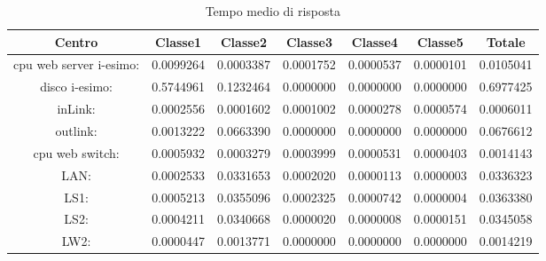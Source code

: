 \begin{table}[H]
\begin{center}\begin{scriptsize}
\begin{tabular}{||c|c|c|c|c|c|c||}
\hline
Centro &Classe1 &Classe2 &Classe3 &Classe4 &Classe5 &Totale\\
\hline
\hline
 cpu web server i-esimo: 	&0.0099264	&0.0003387	&0.0001752	&0.0000537	&0.0000101	&0.0105041\\
\hline
 disco i-esimo: 	&0.5744961	&0.1232464	&0.0000000	&0.0000000	&0.0000000	&0.6977425\\
\hline
 inLink: 	&0.0002556	&0.0001602	&0.0001002	&0.0000278	&0.0000574	&0.0006011\\
\hline
 outlink: 	&0.0013222	&0.0663390	&0.0000000	&0.0000000	&0.0000000	&0.0676612\\
\hline
 cpu web switch: 	&0.0005932	&0.0003279	&0.0003999	&0.0000531	&0.0000403	&0.0014143\\
\hline
 LAN: 	&0.0002533	&0.0331653	&0.0002020	&0.0000113	&0.0000003	&0.0336323\\
\hline
 LS1: 	&0.0005213	&0.0355096	&0.0002325	&0.0000742	&0.0000004	&0.0363380\\
\hline
 LS2: 	&0.0004211	&0.0340668	&0.0000020	&0.0000008	&0.0000151	&0.0345058\\
\hline
 LW2: 	&0.0000447	&0.0013771	&0.0000000	&0.0000000	&0.0000000	&0.0014219\\
\hline
\end{tabular}
\end{scriptsize}\end{center}
\caption{Tempo medio di risposta}
\label{tempomediorisposta}
\end{table}

